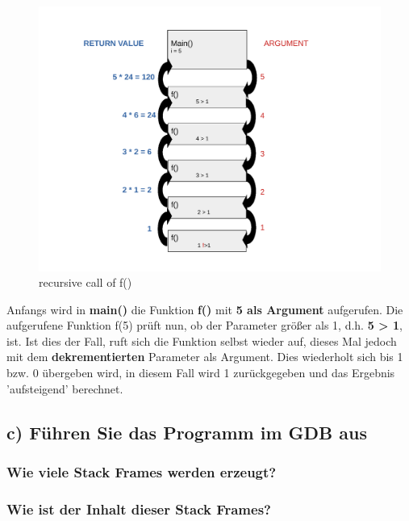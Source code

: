 \documentclass[12pt]{article}
\begin{document}
\begin{center}
\begin{figure}[h]
	\includegraphics[scale=0.6]{Pictures/aufgabe3aufrufe.pdf}
	\caption{recursive call of f()}
	\label{fig:recursive2}
\end{figure}
\end{center}

Anfangs wird in \textbf{main()} die Funktion \textbf{f()} mit \textbf{5 als Argument} aufgerufen. Die aufgerufene Funktion f(5) prüft nun, ob der Parameter größer als 1, d.h. \textbf{5 > 1}, ist. Ist dies der Fall, ruft sich die Funktion selbst wieder auf, dieses Mal jedoch mit dem \textbf{dekrementierten} Parameter als Argument. Dies wiederholt sich bis 1 bzw. 0 übergeben wird, in diesem Fall wird 1 zurückgegeben und das Ergebnis 'aufsteigend' berechnet.

\subsection{c) Führen Sie das Programm im GDB aus}




\subsubsection{Wie viele Stack Frames werden erzeugt?}

\subsubsection{Wie ist der Inhalt dieser Stack Frames?}
\end{document}
